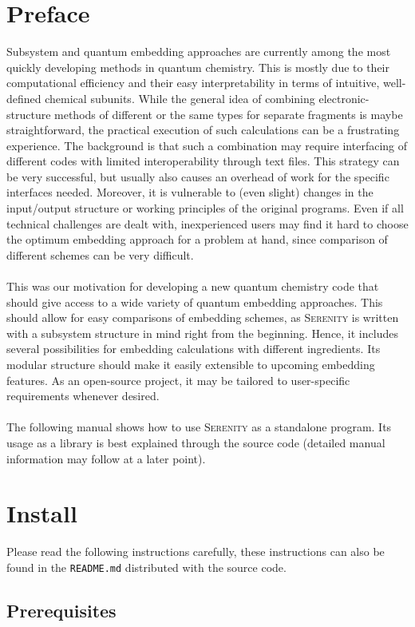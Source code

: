 \documentclass[bibliography=totocnumbered,a4paper,10pt,oneside]{scrbook}
\newcommand{
\serenity}{\textsc{Serenity}\xspace}
\begin{document}
\chapter{Preface}
Subsystem and quantum embedding approaches are currently among the most quickly developing
methods in quantum chemistry. This is mostly due to their computational efficiency
and their easy interpretability in terms of intuitive, well-defined chemical subunits.
While the general idea of combining electronic-structure methods of different or the same
types for separate fragments is maybe straightforward, the practical execution of such
calculations can be a frustrating experience. The background is that such a combination
may require interfacing of different codes with limited interoperability through text files.
This strategy can be very successful, but usually also causes an overhead of work for the specific
interfaces needed. Moreover, it is vulnerable to (even slight) changes in the input/output
structure or working principles of the original programs. Even if all technical challenges
are dealt with, inexperienced users may find it hard to choose the optimum embedding approach
for a problem at hand, since comparison of different schemes can be very difficult.\\
\\
This was our motivation for developing a new quantum chemistry code that should give access
to a wide variety of quantum embedding approaches. This should allow for easy comparisons
of embedding schemes, as \serenity is written with a subsystem structure in mind right from
the beginning. Hence, it includes several possibilities for embedding calculations with
different ingredients. Its modular structure should make it easily extensible to upcoming
embedding features. As an open-source project, it may be tailored to user-specific requirements
whenever desired.\\
\\
The following manual shows how to use \serenity as a standalone program. Its usage as a
library is best explained through the source code (detailed manual
information may follow at a later point).


\chapter{Install}
Please read the following instructions carefully, these instructions can also be found in the \texttt{README.md} distributed with
the source code.

\section{Prerequisites}
\end{document}
